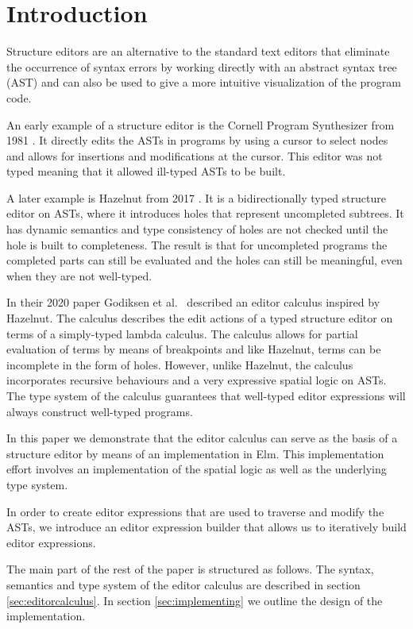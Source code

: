 \section{Introduction}
\label{introduction}

Structure editors are an alternative to the standard text editors that
eliminate the occurrence of syntax errors by working directly with an
abstract syntax tree (AST) and can also be used to give a more intuitive
visualization of the program code.

An early example of a structure editor is the Cornell Program Synthesizer
from 1981 \cornell. It directly edits the ASTs in programs by using a cursor to
select nodes and allows for insertions and modifications at the cursor. This
editor was not typed meaning that it allowed ill-typed ASTs to be built.

A later example is Hazelnut from 2017 \hazel. It is a bidirectionally typed
structure editor on ASTs, where it introduces holes that represent uncompleted
subtrees. It has dynamic semantics and type consistency of holes are not
checked until the hole is built to completeness. The result is that for
uncompleted programs the completed parts can still be evaluated and the holes
can still be meaningful, even when they are not well-typed.

In their 2020 paper Godiksen et al. \pepm~described an editor calculus
inspired by Hazelnut. The calculus describes the edit actions of a 
typed structure editor on terms of a simply-typed lambda
calculus. The calculus allows for partial evaluation of terms by means
of breakpoints and like Hazelnut, terms can be incomplete in the form
of holes. However, unlike Hazelnut, the calculus incorporates recursive
behaviours and a very expressive spatial logic on ASTs. The type
system of the calculus guarantees that well-typed editor expressions
will always construct well-typed programs.

In this paper we demonstrate that the editor calculus can serve as the
basis of a structure editor by means of an implementation in
Elm. This implementation effort involves an implementation of the
spatial logic as well as the underlying type system.

In order to create editor expressions that are used to traverse and modify the
ASTs, we introduce an editor expression builder that allows us to
iteratively build editor expressions.

The main part of the rest of the paper is structured as follows. The syntax, semantics and type
system of the editor calculus are described in section
\ref{sec:editorcalculus}. In section \ref{sec:implementing} we outline
the design of the implementation.


